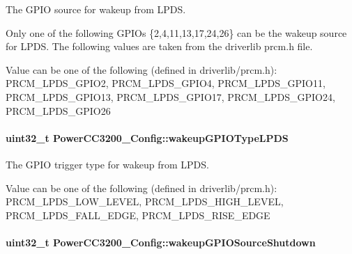 The G\+P\+I\+O source for wakeup from L\+P\+D\+S. 

Only one of the following G\+P\+I\+Os \{2,4,11,13,17,24,26\} can be the wakeup source for L\+P\+D\+S. The following values are taken from the driverlib prcm.\+h file.

Value can be one of the following (defined in driverlib/prcm.\+h)\+: P\+R\+C\+M\+\_\+\+L\+P\+D\+S\+\_\+\+G\+P\+I\+O2, P\+R\+C\+M\+\_\+\+L\+P\+D\+S\+\_\+\+G\+P\+I\+O4, P\+R\+C\+M\+\_\+\+L\+P\+D\+S\+\_\+\+G\+P\+I\+O11, P\+R\+C\+M\+\_\+\+L\+P\+D\+S\+\_\+\+G\+P\+I\+O13, P\+R\+C\+M\+\_\+\+L\+P\+D\+S\+\_\+\+G\+P\+I\+O17, P\+R\+C\+M\+\_\+\+L\+P\+D\+S\+\_\+\+G\+P\+I\+O24, P\+R\+C\+M\+\_\+\+L\+P\+D\+S\+\_\+\+G\+P\+I\+O26 
\paragraph[{wakeup\+G\+P\+I\+O\+Type\+L\+P\+D\+S}]{\setlength{\rightskip}{0pt plus 5cm}uint32\+\_\+t Power\+C\+C3200\+\_\+\+Config\+::wakeup\+G\+P\+I\+O\+Type\+L\+P\+D\+S}\label{struct_power_c_c3200___config_a5125aca3ead9428e8d3bc41fab9740b3}


The G\+P\+I\+O trigger type for wakeup from L\+P\+D\+S. 

Value can be one of the following (defined in driverlib/prcm.\+h)\+: P\+R\+C\+M\+\_\+\+L\+P\+D\+S\+\_\+\+L\+O\+W\+\_\+\+L\+E\+V\+E\+L, P\+R\+C\+M\+\_\+\+L\+P\+D\+S\+\_\+\+H\+I\+G\+H\+\_\+\+L\+E\+V\+E\+L, P\+R\+C\+M\+\_\+\+L\+P\+D\+S\+\_\+\+F\+A\+L\+L\+\_\+\+E\+D\+G\+E, P\+R\+C\+M\+\_\+\+L\+P\+D\+S\+\_\+\+R\+I\+S\+E\+\_\+\+E\+D\+G\+E 
\paragraph[{wakeup\+G\+P\+I\+O\+Source\+Shutdown}]{\setlength{\rightskip}{0pt plus 5cm}uint32\+\_\+t Power\+C\+C3200\+\_\+\+Config\+::wakeup\+G\+P\+I\+O\+Source\+Shutdown}\label{struct_power_c_c3200___config_a1ba7e114e7d9d1497827dd091306ea9b}


